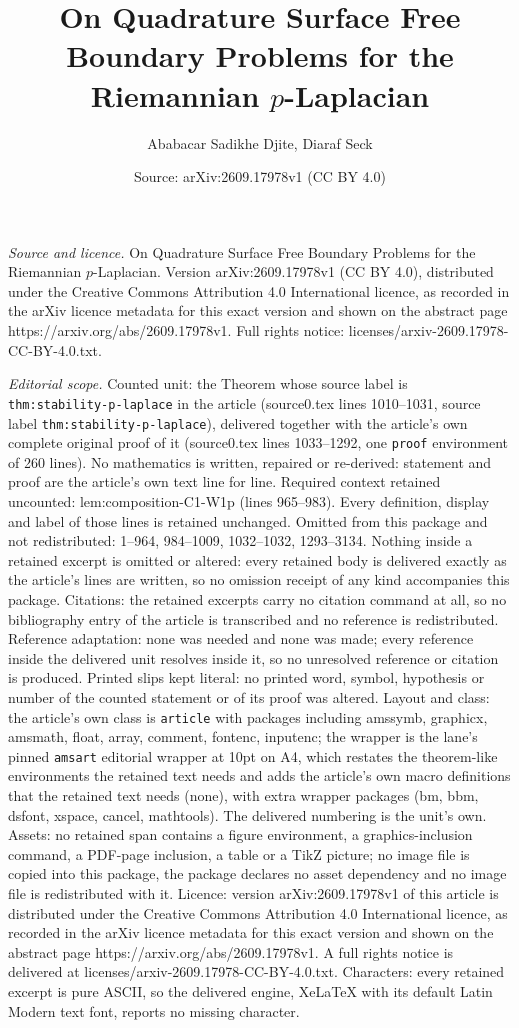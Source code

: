 \documentclass[10pt,a4paper]{amsart}
\title[On Quadrature Surface Free Boundary Problems for the Riemann]{On Quadrature Surface Free Boundary Problems for the Riemannian $p$-Laplacian}
\author{Ababacar Sadikhe Djite, Diaraf Seck}
\date{Source: arXiv:2609.17978v1 (CC BY 4.0)}
\begin{document}
\maketitle

\noindent\emph{Source and licence.} On Quadrature Surface Free Boundary Problems for the Riemannian $p$-Laplacian. Version arXiv:2609.17978v1 (CC BY 4.0), distributed under the Creative Commons Attribution 4.0 International licence, as recorded in the arXiv licence metadata for this exact version and shown on the abstract page https://arxiv.org/abs/2609.17978v1. Full rights notice: licenses/arxiv-2609.17978-CC-BY-4.0.txt.\par\smallskip

\noindent\textit{Editorial scope.} Counted unit: the Theorem whose source label is \texttt{thm:stability-p-laplace} in the article (source0.tex lines 1010--1031, source label \texttt{thm:stability-p-laplace}), delivered together with the article's own complete original proof of it (source0.tex lines 1033--1292, one \texttt{proof} environment of 260 lines). No mathematics is written, repaired or re-derived: statement and proof are the article's own text line for line. Required context retained uncounted: lem:composition-C1-W1p (lines 965--983). Every definition, display and label of those lines is retained unchanged. Omitted from this package and not redistributed: 1--964, 984--1009, 1032--1032, 1293--3134. Nothing inside a retained excerpt is omitted or altered: every retained body is delivered exactly as the article's lines are written, so no omission receipt of any kind accompanies this package. Citations: the retained excerpts carry no citation command at all, so no bibliography entry of the article is transcribed and no reference is redistributed. Reference adaptation: none was needed and none was made; every reference inside the delivered unit resolves inside it, so no unresolved reference or citation is produced. Printed slips kept literal: no printed word, symbol, hypothesis or number of the counted statement or of its proof was altered. Layout and class: the article's own class is \texttt{article} with packages including amssymb, graphicx, amsmath, float, array, comment, fontenc, inputenc; the wrapper is the lane's pinned \texttt{amsart} editorial wrapper at 10pt on A4, which restates the theorem-like environments the retained text needs and adds the article's own macro definitions that the retained text needs (none), with extra wrapper packages (bm, bbm, dsfont, xspace, cancel, mathtools). The delivered numbering is the unit's own. Assets: no retained span contains a figure environment, a graphics-inclusion command, a PDF-page inclusion, a table or a TikZ picture; no image file is copied into this package, the package declares no asset dependency and no image file is redistributed with it. Licence: version arXiv:2609.17978v1 of this article is distributed under the Creative Commons Attribution 4.0 International licence, as recorded in the arXiv licence metadata for this exact version and shown on the abstract page https://arxiv.org/abs/2609.17978v1. A full rights notice is delivered at licenses/arxiv-2609.17978-CC-BY-4.0.txt. Characters: every retained excerpt is pure ASCII, so the delivered engine, XeLaTeX with its default Latin Modern text font, reports no missing character.
\end{document}
